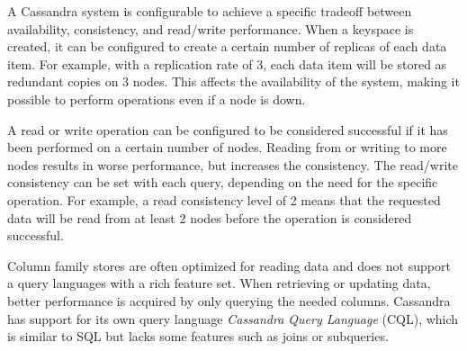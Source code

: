 A Cassandra system is configurable to achieve a specific tradeoff between availability, consistency, and read/write performance. When a keyspace is created, it can be configured to create a certain number of replicas of each data item. For example, with a replication rate of 3, each data item will be stored as redundant copies on 3 nodes. This affects the availability of the system, making it possible to perform operations even if a node is down.

A read or write operation can be configured to be considered successful if it has been performed on a certain number of nodes. Reading from or writing to more nodes results in worse performance, but increases the consistency. The read/write consistency can be set with each query, depending on the need for the specific operation. For example, a read consistency level of 2 means that the requested data will be read from at least 2 nodes before the operation is considered successful.

Column family stores are often optimized for reading data and does not support a query languages with a rich feature set. When retrieving or updating data, better performance is acquired by only querying the needed columns. Cassandra has support for its own query language \emph{Cassandra Query Language} (CQL), which is similar to SQL but lacks some features such as joins or subqueries.
